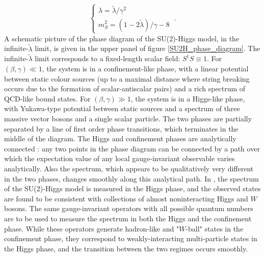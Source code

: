 \begin{equation}
\begin{cases}
\lambda = \tilde \lambda/\gamma^2\\
m_S^2 = (1-2\tilde\lambda)/\gamma - 8 
\end{cases} \: .
\end{equation}
%
A schematic picture of the phase diagram of the SU(2)-Higgs model, in the infinite-$\tilde \lambda$ limit, is given in the upper panel of figure \ref{SU2H_phase_diagram}. The infinite-$\tilde \lambda$ limit corresponds to a fixed-length scalar field: $S^{\dagger} S \equiv 1$. For $(\beta,\gamma) \ll 1$, the system is in a confinement-like phase, with a linear potential between static colour sources (up to a maximal distance where string breaking occurs due to the formation of scalar-antiscalar pairs) and a rich spectrum of QCD-like bound states. For $(\beta,\gamma) \gg 1$, the system is in a Higgs-like phase, with Yukawa-type potential between static sources and a spectrum of three massive vector bosons and a single scalar particle. The two phases are partially separated by a line of first order phase transitions, which terminates in the middle of the diagram. The Higgs and confinement phases are analytically connected \cite{Fradkin:1978dv,OSTERWALDER1978440}: any two points in the phase diagram can be connected by a path over which the expectation value of any local gauge-invariant observable varies analytically. Also the spectrum, which appears to be qualitatively very different in the two phases, changes smoothly along this analytical path. In \cite{Wurtz:2013ova}, the spectrum of the SU(2)-Higgs model is measured in the Higgs phase, and the observed states are found to be consistent with collections of almost noninteracting Higgs and $W$ bosons. The same gauge-invariant operators with all possible quantum numbers are to be used to measure the spectrum in both the Higgs and the confinement phase. While these operators generate hadron-like and "$W$-ball" states in the confinement phase, they correspond to weakly-interacting multi-particle states in the Higgs phase, and the transition between the two regimes occurs smoothly. 

